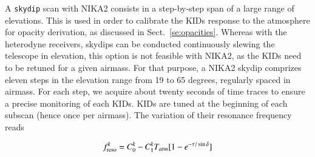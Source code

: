 A {\tt skydip} scan with NIKA2 consists in a step-by-step span
of a large range of elevations. This is used in order to calibrate the
KIDs response to the atmosphere for opacity derivation, as discussed in
Sect.~\ref{se:opacities}.
Whereas with the heterodyne receivers, skydips can be
conducted continuously slewing the telescope in elevation, this
option is not feasible with NIKA2, as the KIDs need to be retuned
for a given airmass.
For that purpose, a NIKA2 skydip comprizes eleven steps in
the elevation range from 19 to 65 degrees, regularly spaced in
airmass. For each step, we acquire about twenty seconds of time traces
to ensure a precise monitoring of each KIDs. KIDs are tuned at the beginning of
each subscan (hence once per airmass). The variation of their resonance
frequency reads

\begin{equation}
  f_{\rm{reso}}^k  = C_0^k - C_1^k T_{atm}[1-e^{-\tau/\sin\delta}]
\label{eq:skydip_1}
\end{equation}



\subsection{\bms}
\label{se:beammaps}

